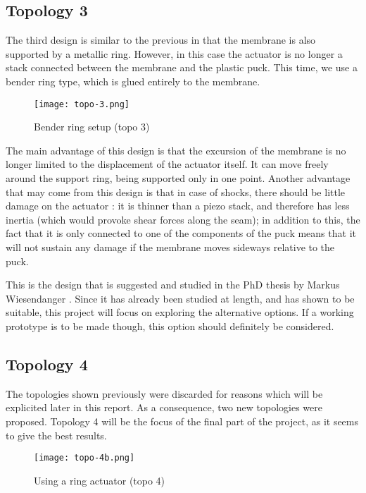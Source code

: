 \subsection{Topology 3}

The third design is similar to the previous in that the membrane is also
supported by a metallic ring. However, in this case the actuator is no longer a
stack connected between the membrane and the plastic puck. This time, we use a
bender ring type, which is glued entirely to the membrane.

\begin{figure}[h]
  \begin{center}
    \texttt{[image: topo-3.png]}
  \end{center}
  \caption{Bender ring setup (topo 3)}
  \label{fig:topo-3}
\end{figure}

The main advantage of this design is that the excursion of the membrane is no
longer limited to the displacement of the actuator itself. It can move freely
around the support ring, being supported only in one point. Another advantage
that may come from this design is that in case of shocks, there should be little
damage on the actuator : it is thinner than a piezo stack, and therefore has
less inertia (which would provoke shear forces along the seam); in addition to
this, the fact that it is only connected to one of the components of the puck
means that it will not sustain any damage if the membrane moves sideways
relative to the puck.

This is the design that is suggested and studied in the PhD thesis by Markus
Wiesendanger \cite{wiesendanger2001}. Since it has already been studied at
length, and has shown to be suitable, this project will focus on exploring the
alternative options. If a working prototype is to be made though, this option
should definitely be considered.

\subsection{Topology 4}

The topologies shown previously were discarded for reasons which will be
explicited later in this report. As a consequence, two new topologies were
proposed. Topology 4 will be the focus of the final part of the project, as it
seems to give the best results.

\begin{figure}[h]
  \begin{center}
    \texttt{[image: topo-4b.png]}
  \end{center}
  \caption{Using a ring actuator (topo 4)}
  \label{fig:topo-4b}
\end{figure}

